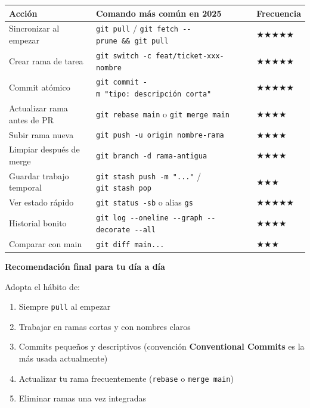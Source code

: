 \documentclass[
  doc,
  floatsintext,
  longtable,
  a4paper,
  nolmodern,
  notxfonts,
  notimes,
  12pt,
  colorlinks=true,linkcolor=blue,citecolor=blue,urlcolor=blue]{apa7}
\providecommand{\tightlist}{%
  \setlength{\itemsep}{0pt}\setlength{\parskip}{0pt}}
\newcounter{none} %
\begin{document}
{\def\LTcaptype{none} %
\begin{longtable}[]{@{}
  >{\raggedright\arraybackslash}p{}
  >{\raggedright\arraybackslash}p{}
  >{\raggedright\arraybackslash}p{}@{}}
\toprule\noalign{}
\begin{minipage}[b]{\linewidth}\raggedright
Acción
\end{minipage} & \begin{minipage}[b]{\linewidth}\raggedright
Comando más común en 2025
\end{minipage} & \begin{minipage}[b]{\linewidth}\raggedright
Frecuencia
\end{minipage} \\
\midrule\noalign{}
\endhead
\bottomrule\noalign{}
\endlastfoot
Sincronizar al empezar & \texttt{git\ pull} /
\texttt{git\ fetch\ -\/-prune\ \&\&\ git\ pull} & ★★★★★ \\
Crear rama de tarea & \texttt{git\ switch\ -c\ feat/ticket-xxx-nombre} &
★★★★★ \\
Commit atómico & \texttt{git\ commit\ -m\ "tipo:\ descripción\ corta"} &
★★★★★ \\
Actualizar rama antes de PR & \texttt{git\ rebase\ main} o
\texttt{git\ merge\ main} & ★★★★ \\
Subir rama nueva & \texttt{git\ push\ -u\ origin\ nombre-rama} & ★★★★ \\
Limpiar después de merge & \texttt{git\ branch\ -d\ rama-antigua} &
★★★★ \\
Guardar trabajo temporal & \texttt{git\ stash\ push\ -m\ "..."} /
\texttt{git\ stash\ pop} & ★★★ \\
Ver estado rápido & \texttt{git\ status\ -sb} o alias \texttt{gs} &
★★★★★ \\
Historial bonito &
\texttt{git\ log\ -\/-oneline\ -\/-graph\ -\/-decorate\ -\/-all} &
★★★★ \\
Comparar con main & \texttt{git\ diff\ main...} & ★★★ \\
\end{longtable}
}

\textbf{Recomendación final para tu día a día}

Adopta el hábito de:

\begin{enumerate}
\def\labelenumi{\arabic{enumi}.}
\tightlist
\item
  Siempre \texttt{pull} al empezar
\item
  Trabajar en ramas cortas y con nombres claros
\item
  Commits pequeños y descriptivos (convención \textbf{Conventional
  Commits} es la más usada actualmente)
\item
  Actualizar tu rama frecuentemente (\texttt{rebase} o
  \texttt{merge\ main})
\item
  Eliminar ramas una vez integradas
\end{enumerate}
\end{document}
